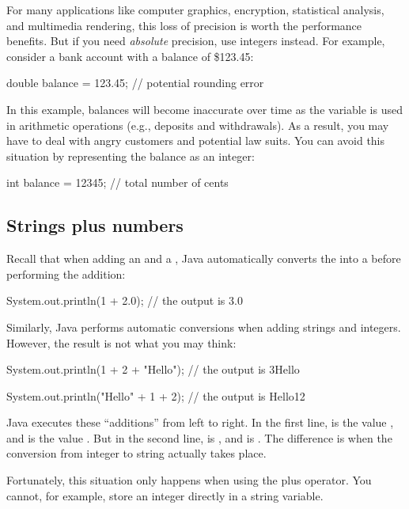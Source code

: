For many applications like computer graphics, encryption, statistical analysis, and multimedia rendering, this loss of precision is worth the performance benefits.
But if you need {\em absolute} precision, use integers instead.
For example, consider a bank account with a balance of \$123.45:

\begin{code}
    double balance = 123.45;  // potential rounding error
\end{code}

In this example, balances will become inaccurate over time as the variable is used in arithmetic operations (e.g., deposits and withdrawals).
As a result, you may have to deal with angry customers and potential law suits.
You can avoid this situation by representing the balance as an integer:

\begin{code}
    int balance = 12345;      // total number of cents
\end{code}

\subsection{Strings plus numbers}

Recall that when adding an  and a , Java automatically converts the  into a  before performing the addition:

\begin{code}
    System.out.println(1 + 2.0);
    // the output is 3.0
\end{code}

Similarly, Java performs automatic conversions when adding strings and integers.
However, the result is not what you may think:

\begin{code}
    System.out.println(1 + 2 + "Hello");
    // the output is 3Hello
    
    System.out.println("Hello" + 1 + 2);
    // the output is Hello12
\end{code}

Java executes these ``additions'' from left to right.
In the first line,  is the value , and  is the value .
But in the second line,  is , and  is .
The difference is when the conversion from integer to string actually takes place.

Fortunately, this situation only happens when using the plus operator.
You cannot, for example, store an integer directly in a string variable.


